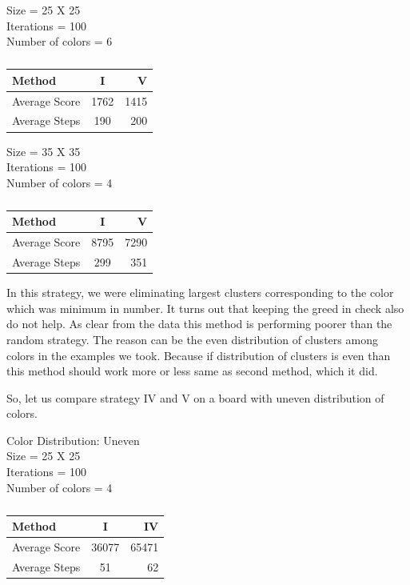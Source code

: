 \documentclass[twoside]{article}
\begin{document}
\begin{multicols}{2}
\begin{table}[H]
\caption{}
Size = 25 X 25	\\
Iterations = 100\\
Number of colors = 6	\\
\centering
\begin{tabular}{l | c| r}
\toprule
Method & I & V \\
\hline
Average Score & 1762 & 1415 \\
\hline
Average Steps & 190 & 200 \\
\hline
\bottomrule
\end{tabular}
\end{table}

\begin{table}[H]
\caption{}
Size = 35 X 35	\\
Iterations = 100\\
Number of colors = 4	\\
\centering
\begin{tabular}{l | c| r}
\toprule
Method & I & V \\
\hline
Average Score & 8795 & 7290 \\
\hline
Average Steps & 299 & 351 \\
\hline
\bottomrule
\end{tabular}
\end{table}

In this strategy, we were eliminating largest clusters corresponding to the color which was minimum in number. It turns out that 
keeping the greed in check also do not help. As clear from the data this method is performing poorer than the random strategy. The
reason can be the even distribution of clusters among colors in the examples we took. Because if distribution of clusters is even 
than this method should work more or less same as second method, which it did.

So, let us compare strategy IV and V on a board with uneven distribution of colors.

\begin{table}[H]
\caption{}
Color Distribution: Uneven\\
Size = 25 X 25	\\
Iterations = 100\\
Number of colors = 4	\\
\centering
\begin{tabular}{l | c| r}
\toprule
Method & I & IV \\
\hline
Average Score & 36077 & 65471 \\
\hline
Average Steps & 51 & 62 \\
\hline
\bottomrule
\end{tabular}
\end{table}


\end{multicols}
\end{document}
